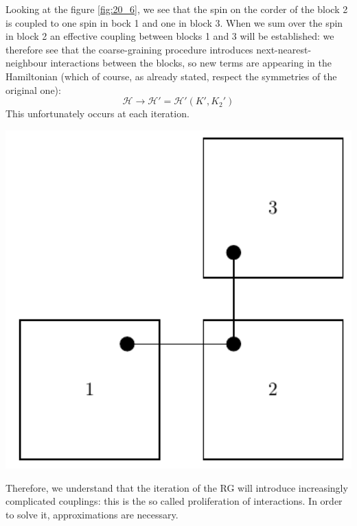 \documentclass[../main/main.tex]{subfiles}
\begin{document}
\begin{minipage}[c]{0.6\linewidth}
  \vspace{0.3cm}
Looking at the figure \ref{fig:20_6}, we see that the spin on the corder of the block 2 is coupled to one spin in bock 1 and one in block 3. When we sum over the spin in block 2 an effective coupling between blocks 1 and 3 will be established: we therefore see that the coarse-graining procedure introduces next-nearest-neighbour interactions between the blocks, so new terms are appearing in the Hamiltonian (which of course, as already stated, respect the symmetries of the original one):
\begin{equation*}
  \mathcal{H} \rightarrow \mathcal{H}' = \mathcal{H}' (K',K_2')
\end{equation*}
This unfortunately occurs at each iteration.
  \vspace{0.3cm}
\end{minipage}
\hspace{0.02\linewidth}
\begin{minipage}[]{0.35\linewidth}
\centering
\includegraphics[width=1\textwidth]{../lessons/20_image/6.pdf}
\end{minipage}
Therefore, we understand that the iteration of the RG will introduce increasingly complicated couplings: this is the so called proliferation of interactions. In order to solve it, approximations are necessary.
\end{document}
